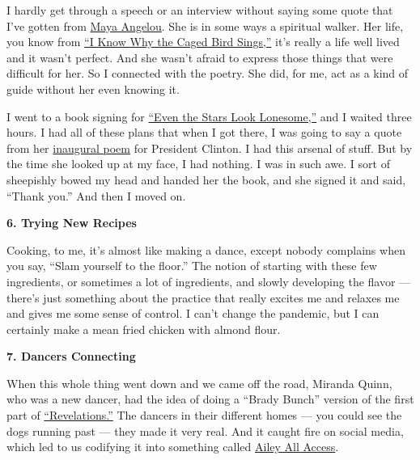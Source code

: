 I hardly get through a speech or an interview without saying some quote
that I've gotten from
\href{https://www.nytimes3xbfgragh.onion/2014/05/29/arts/maya-angelou-lyrical-witness-of-the-jim-crow-south-dies-at-86.html}{Maya
Angelou}. She is in some ways a spiritual walker. Her life, you know
from
\href{https://www.nytimes3xbfgragh.onion/2014/05/29/arts/her-face-was-a-brown-moon-that-shone-on-me.html}{``I
Know Why the Caged Bird Sings,''} it's really a life well lived and it
wasn't perfect. And she wasn't afraid to express those things that were
difficult for her. So I connected with the poetry. She did, for me, act
as a kind of guide without her even knowing it.

I went to a book signing for
\href{https://www.penguinrandomhouse.com/books/3916/even-the-stars-look-lonesome-by-maya-angelou/}{``Even
the Stars Look Lonesome,''} and I waited three hours. I had all of these
plans that when I got there, I was going to say a quote from her
\href{https://www.nytimes3xbfgragh.onion/video/books/100000002906088/maya-angelou-at-the-clinton-inauguration.html}{inaugural
poem} for President Clinton. I had this arsenal of stuff. But by the
time she looked up at my face, I had nothing. I was in such awe. I sort
of sheepishly bowed my head and handed her the book, and she signed it
and said, ``Thank you.'' And then I moved on.

\textbf{6. Trying New Recipes}

Cooking, to me, it's almost like making a dance, except nobody complains
when you say, ``Slam yourself to the floor.'' The notion of starting
with these few ingredients, or sometimes a lot of ingredients, and
slowly developing the flavor --- there's just something about the
practice that really excites me and relaxes me and gives me some sense
of control. I can't change the pandemic, but I can certainly make a mean
fried chicken with almond flour.

\textbf{7. Dancers Connecting}

When this whole thing went down and we came off the road, Miranda Quinn,
who was a new dancer, had the idea of doing a ``Brady Bunch'' version of
the first part of
\href{https://www.youtube.com/watch?v=gEFW5JznwOY}{``Revelations.''} The
dancers in their different homes --- you could see the dogs running past
--- they made it very real. And it caught fire on social media, which
led to us codifying it into something called
\href{https://www.alvinailey.org/performances-tickets/ailey-all-access}{Ailey
All Access}.

